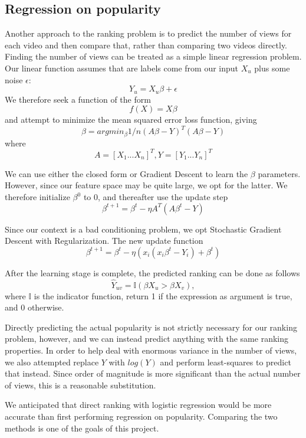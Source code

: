\subsection{Regression on popularity}
\label{sec:regression}
Another approach to the ranking problem is to predict the number of views for each video and then compare that, rather than comparing two videos directly. Finding the number of views can be treated as a simple linear regression problem. Our linear function assumes that are labels come from our input $X_u$ plus some noise $\epsilon$:
\begin{equation}
Y_u = X_u \beta + \epsilon
\end{equation}
We therefore seek a function of the form
\begin{equation}
f(X) = X \beta
\end{equation}
and attempt to minimize the mean squared error loss function, giving
\begin{equation}
\beta = arg min_\beta 1/n (A \beta - Y)^T(A \beta - Y)
\end{equation}
where
\begin{equation}
A = [X_1 ... X_n]^T, Y = [Y_1 ... Y_n]^T
\end{equation}
  
We can use either the closed form or Gradient Descent to learn the $\beta$ parameters.  However, since our feature space may be quite large, we opt for the latter.  We therefore initialize $\beta^0$ to 0, and thereafter use the update step
\begin{equation}
\beta^{t+1} = \beta^t - \eta A^T (A \beta^t - Y)
\end{equation}
 
Since our context is a bad conditioning problem, we opt Stochastic Gradient Descent with Regularization. The new update function
	\begin{equation}
		\beta^{t+1} = \beta^t - \eta (x_i (x_i\beta^t - Y_i) + \beta^t)
	\end{equation}

After the learning stage is complete, the predicted ranking can be done as follows
\begin{equation}
\hat{Y}_{uv} = \mathbb{I}(\beta X_u > \beta X_v),
\end{equation}
where $\mathbb{I}$ is the indicator function, return 1 if the expression as argument is true, and 0 otherwise.

Directly predicting the actual popularity is not strictly necessary for our ranking problem, however, and we can instead predict anything with the same ranking properties.  In order to help deal with enormous variance in the number of views, we also attempted replace $Y$ with $log(Y)$ and perform least-squares to predict that instead.  Since order of magnitude is more significant than the actual number of views, this is a reasonable substitution.

We anticipated that direct ranking with logistic regression would be more accurate than first performing regression on popularity.  Comparing the two methods is one of the goals of this project.
